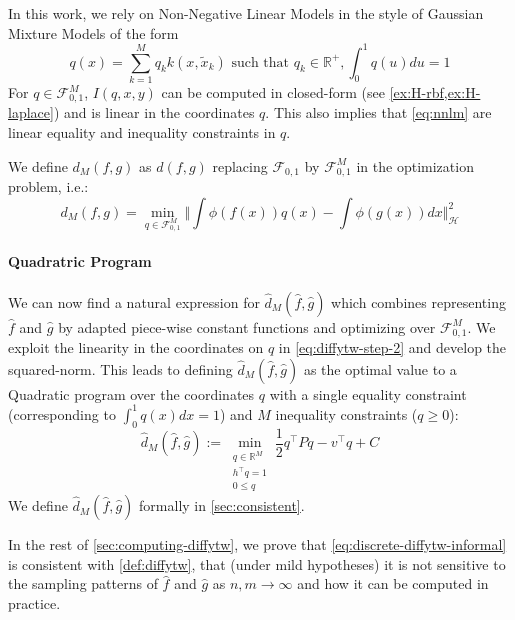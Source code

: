 In this work, we rely on Non-Negative Linear Models in the style of Gaussian Mixture Models of the form
\begin{equation}\label{eq:nnlm}
q(x) = \sum_{k=1}^M q_k k(x, \tilde x_k)\text{ such that } q_k\in\mathbb R^+, \int_0^1q(u)du=1
\end{equation}
For $q\in\mathcal F_{0,1}^M$, $I(q, x, y)$ can be computed in closed-form (see \cref{ex:H-rbf,ex:H-laplace}) and is linear in the coordinates $q$. This also implies that \cref{eq:nnlm} are linear equality and inequality constraints in $q$.

We define $d_M(f, g)$ as $d(f,g)$ replacing $\mathcal F_{0,1}$ by $\mathcal F_{0,1}^M$ in the optimization problem, i.e.:
\begin{equation}\label{eq:hat-d_M}
d_M(f, g) = \min_{q \in\mathcal F_{0,1}^M} \Vert \int \phi(f(x))q(x) - \int \phi(g(x))dx\Vert_\mathcal H^2
\end{equation}

\paragraph{Quadratric Program} We can now find a natural expression for $\hat d_M(\hat f, \hat g)$ which combines representing $\hat f$ and $\hat g$ by adapted piece-wise constant functions and optimizing over $\mathcal F_{0,1}^M$. We exploit the linearity in the coordinates on $q$ in \cref{eq:diffytw-step-2} and develop the squared-norm. This leads to defining $\hat d_M(\hat f, \hat g)$ as the optimal value to a Quadratic program over the coordinates $q$ with a single equality constraint (corresponding to $\int_0^1q(x)dx = 1$) and $M$ inequality constraints ($q \geq 0$):
\begin{equation}\label{eq:discrete-diffytw-informal}
\hat d_M(\hat f, \hat g) :=\min_{\substack{q\in\mathbb R^{M}\\h^\top q=1\\0 \leq q}}\frac{1}{2}q^\top Pq - v^\top q + C
\end{equation}
We define $\hat d_M(\hat f, \hat g)$ formally in \cref{sec:consistent}.

In the rest of \cref{sec:computing-diffytw}, we prove that \cref{eq:discrete-diffytw-informal} is consistent with \cref{def:diffytw}, that (under mild hypotheses) it is not sensitive to the sampling patterns of $\hat f$ and $\hat g$ as $n, m\to\infty$ and how it can be computed in practice.

